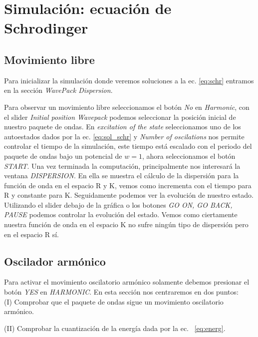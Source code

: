 \section{Simulaci\'on: ecuaci\'on de Schrodinger}
\subsection{Movimiento libre}
Para inicializar la simulaci\'on donde veremos soluciones a la ec. \eqref{eq:schr} entramos en la secci\'on \textit{WavePack Dispersion}.

Para observar un movimiento libre seleccionamos el bot\'on \textit{No} en \textit{Harmonic}, con el slider \textit{Initial position Wavepack} podemos seleccionar la posici\'on inicial de nuestro paquete de ondas. En \textit{excitation of the state} seleccionamos uno de los autoestados dados por la ec. \eqref{eq:sol_schr} y \textit{Number of oscilations} nos permite controlar el tiempo de la simulaci\'on, este tiempo est\'a escalado con el periodo del paquete de ondas bajo un potencial de $w=1$, ahora seleccionamos el bot\'on \textit{START}. Una vez terminada la computaci\'on, principalmente nos interesar\'a la ventana \textit{DISPERSION}. En ella se muestra el c\'alculo de la dispersi\'on para la funci\'on de onda en el espacio R y K, vemos como incrementa con el tiempo para R y constante para K. Seguidamente podemos ver la evoluci\'on de nuestro estado. Utilizando el slider debajo de la gr\'afica o los botones \textit{GO ON, GO BACK, PAUSE} podemos controlar la evoluci\'on del estado. Vemos como ciertamente nuestra funci\'on de onda en el espacio K no sufre ning\'un tipo de dispersi\'on pero en el espacio R s\'i.

\subsection{Oscilador arm\'onico}

Para activar el movimiento oscilatorio arm\'onico solamente debemos presionar el bot\'on \textit{YES} en \textit{HARMONIC}. En esta secci\'on nos centraremos en dos puntos:
\\

(I) Comprobar que el paquete de ondas sigue un movimiento oscilatorio arm\'onico.

(II) Comprobar la cuantizaci\'on de la energ\'ia dada por la ec.  ~\eqref{eq:energ}.
\\

